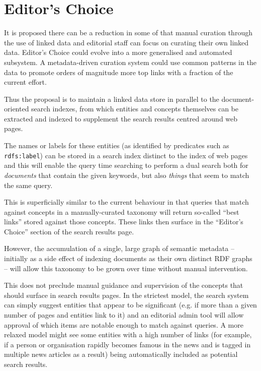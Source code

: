 \section{Editor's Choice}

It is proposed there can be
a reduction in some of that manual curation through the use
of linked data and editorial staff can focus on curating
their own linked data. Editor's Choice could evolve into a more
generalised and automated subsystem. A metadata-driven curation system
could use common patterns in the data to promote orders of magnitude more
top links with a fraction of the current effort.

Thus the proposal is to maintain a linked data store in parallel
to the document-oriented search indexes, from which entities
and concepts themselves can be extracted and indexed to supplement
the search results centred around web pages.

The names or labels for these entities (as identified by
predicates such as \texttt{rdfs:label}) can be stored in
a search index distinct to the index of web pages and this
will enable the query time searching to perform a dual search
both for \emph{documents} that contain the given keywords,
but also \emph{things} that seem to match the same query.

This is superficially similar to the current behaviour in that
queries that match against concepts in a manually-curated
taxonomy will return so-called ``best links'' stored
against those concepts. These links then surface in the 
``Editor's Choice'' section of the search results page.

However, the accumulation of a single, large graph of
semantic metadata -- initially as a side effect of
indexing documents as their own distinct RDF graphs --
will allow this taxonomy to be grown over time without
manual intervention.

This does not preclude manual guidance and supervision of the
concepts that should surface in search results pages. In
the strictest model, the search system can simply suggest
entities that appear to be significant (e.g. if more
than a given number of pages and entities link to it) and an
editorial admin tool will allow approval of which items are
notable enough to match against queries. A more relaxed
model might see some entities with a high number of links
(for example, if a person or organisation rapidly becomes
famous in the news and is tagged in multiple news articles
as a result) being automatically included as potential
search results.

